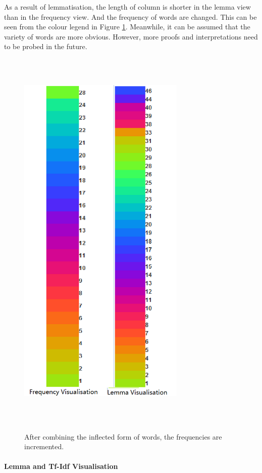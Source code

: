 As a result of lemmatisation, the length of column is shorter in the lemma view than in the frequency view. And the frequency of words are changed. This can be seen from the colour legend in Figure \ref{fig:freqLemmaComp}. Meanwhile, it can be assumed that the variety of words are more obvious. However, more proofs and interpretations need to be probed in the future.

\begin{figure}[h]
	\centering	
	\includegraphics[width=8cm, height=19cm]{Figs/Freq-Lemma-Comparison}\\[1ex]
	\caption{} After combining the inflected form of words, the frequencies are incremented.
	\label{fig:freqLemmaComp}
\end{figure} 

\paragraph{Lemma and Tf-Idf Visualisation}
